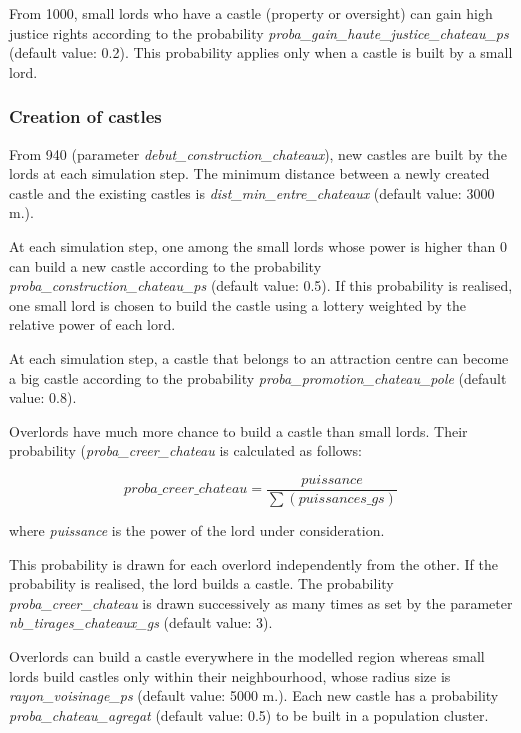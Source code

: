 \documentclass[a4paper,11pt]{article}
\begin{document}
{\begin{sloppypar}
From 1000, small lords who have a castle (property or oversight) can gain high justice rights according to the probability \textit{proba\_gain\_haute\_justice\_chateau\_ps} (default value: 0.2). This probability applies only when a castle is built by a small lord.
\end{sloppypar}


\subsubsection{Creation of castles}

\begin{sloppypar}
From 940 (parameter \textit{debut\_construction\_chateaux}), new castles are built by the lords at each simulation step. The minimum distance between a newly created castle and the existing castles is \textit{dist\_min\_entre\_chateaux} (default value: 3000 m.).

\bigskip
At each simulation step, one among the small lords whose power is higher than $0$ can build a new castle according to the probability \textit{proba\_construction\_chateau\_ps} (default value: 0.5). 
If this probability is realised, one small lord is chosen to build the castle using a lottery weighted by the relative power of each lord.

At each simulation step, a castle that belongs to an attraction centre can become a big castle according to the probability \textit{proba\_promotion\_chateau\_pole} (default value: 0.8).
\end{sloppypar}

\bigskip
Overlords have much more chance to build a castle than small lords. Their probability (\textit{proba\_creer\_chateau} is calculated as follows:
\begin{small}
\begin{equation}
proba\_creer\_chateau = \frac{puissance}{\sum(puissances\_gs)}
\end{equation}
\end{small}
where \textit{puissance} is the power of the lord under consideration.

This probability is drawn for each overlord independently from the other. If the probability is realised, the lord builds a castle. The probability \textit{proba\_creer\_chateau} is drawn successively as many times as set by the parameter \textit{nb\_tirages\_chateaux\_gs} (default value: 3).

\bigskip
Overlords can build a castle everywhere in the modelled region whereas small lords build castles only within their neighbourhood, whose radius size is \textit{rayon\_voisinage\_ps} (default value: 5000 m.). Each new castle has a probability \textit{proba\_chateau\_agregat} (default value: 0.5) to be built in a population cluster.

}
\end{document}

